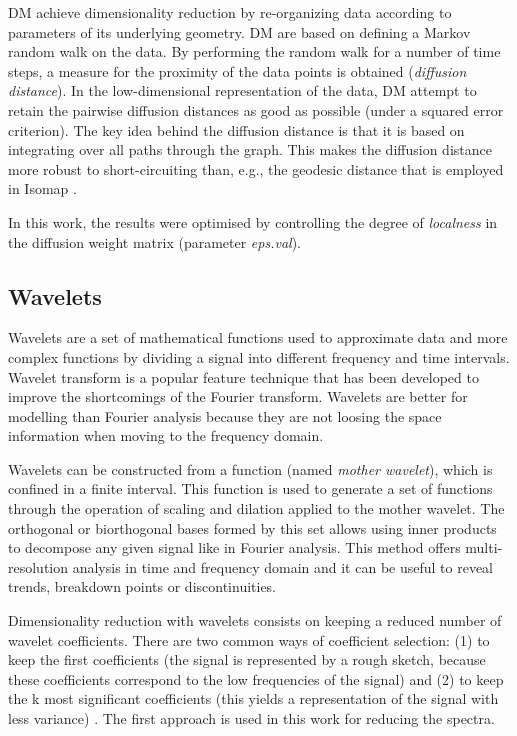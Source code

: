 \documentclass[a4paper,fleqn,usenatbib]{mnras}
\begin{document}
DM achieve dimensionality reduction by re-organizing data according to
parameters of its underlying geometry. DM are based on defining a
Markov random walk on the data. By performing the random walk for a
number of time steps, a measure for the proximity of the data points
is obtained (\textit{diffusion distance}). In the low-dimensional
representation of the data, DM attempt to retain the pairwise
diffusion distances as good as possible (under a squared error
criterion). The key idea behind the diffusion distance is that it is
based on integrating over all paths through the graph. This makes the
diffusion distance more robust to short-circuiting than, e.g., the
geodesic distance that is employed in Isomap \citep{tenenbaum:00}.

In this work, the results were optimised by controlling the degree 
of {\sl localness} in the diffusion weight matrix (parameter \textit{eps.val}).

\subsection{Wavelets}

Wavelets \citep{mallat:98} are a set of mathematical functions used to
approximate data and more complex functions by dividing a signal into
different frequency and time intervals.  Wavelet transform is a
popular feature technique that has been developed to improve the
shortcomings of the Fourier transform. Wavelets are better for
modelling than Fourier analysis because they are not loosing the space
information when moving to the frequency domain.

Wavelets can be constructed from a function (named \textit{mother
  wavelet}), which is confined in a finite interval. This function is
used to generate a set of functions through the operation of scaling
and dilation applied to the mother wavelet. The orthogonal or
biorthogonal bases formed by this set allows using inner products to
decompose any given signal like in Fourier analysis.  This method
offers multi-resolution analysis in time and frequency domain and it
can be useful to reveal trends, breakdown points or discontinuities.

Dimensionality reduction with wavelets consists on keeping a reduced
number of wavelet coefficients. There are two common ways of
coefficient selection: (1) to keep the first coefficients (the signal
is represented by a rough sketch, because these coefficients
correspond to the low frequencies of the signal) and (2) to keep the k
most significant coefficients (this yields a representation
  of the signal with less variance) \citep{li:10}. The first
approach is used in this work for reducing the spectra.
\end{document}
